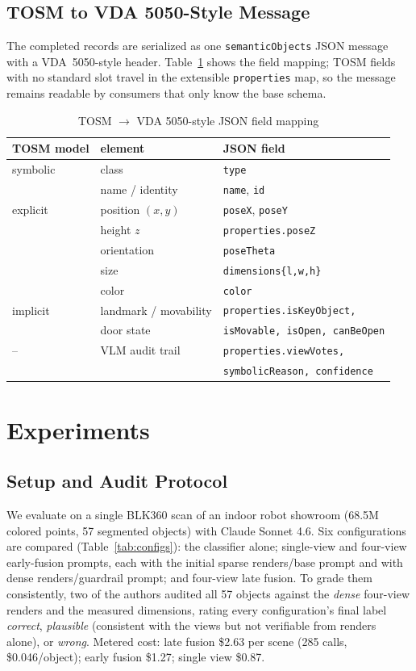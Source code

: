 \documentclass[conference]{IEEEtran}
\begin{document}
\subsection{TOSM to VDA 5050-Style Message}
The completed records are serialized as one \texttt{semanticObjects} JSON
message with a VDA~5050-style header. Table~\ref{tab:mapping} shows the
field mapping; TOSM fields with no standard slot travel in the extensible
\texttt{properties} map, so the message remains readable by consumers that
only know the base schema.

\begin{table}[t]
\caption{TOSM $\rightarrow$ VDA 5050-style JSON field mapping}
\label{tab:mapping}
\centering
\footnotesize
\begin{tabular}{@{}lll@{}}
\toprule
TOSM model & element & JSON field \\
\midrule
symbolic & class & \texttt{type} \\
         & name / identity & \texttt{name}, \texttt{id} \\
explicit & position $(x,y)$ & \texttt{poseX}, \texttt{poseY} \\
         & height $z$ & \texttt{properties.poseZ} \\
         & orientation & \texttt{poseTheta} \\
         & size & \texttt{dimensions\{l,w,h\}} \\
         & color & \texttt{color} \\
implicit & landmark / movability & \texttt{properties.isKeyObject,} \\
         & door state & \texttt{isMovable, isOpen, canBeOpen} \\
--       & VLM audit trail & \texttt{properties.viewVotes,} \\
         &                 & \texttt{symbolicReason, confidence} \\
\bottomrule
\end{tabular}
\end{table}

\section{Experiments}

\subsection{Setup and Audit Protocol}
We evaluate on a single BLK360 scan of an indoor robot showroom (68.5M
colored points, 57 segmented objects) with Claude Sonnet 4.6. Six
configurations are compared (Table~\ref{tab:configs}): the classifier
alone; single-view and four-view early-fusion prompts, each with the
initial sparse renders/base prompt and with dense renders/guardrail prompt;
and four-view late fusion. To grade them consistently, two of the authors
audited all 57 objects against the \emph{dense} four-view renders and the
measured dimensions, rating every configuration's final label
\emph{correct}, \emph{plausible} (consistent with the views but not
verifiable from renders alone), or \emph{wrong}. Metered cost: late fusion
\$2.63 per scene (285 calls, \$0.046/object); early fusion \$1.27; single
view \$0.87.
\end{document}

